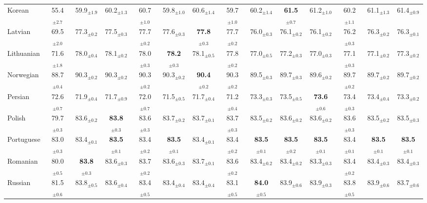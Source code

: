 \begin{table*}[ht]
{\begin{tabular}{lccccccccccccc}
Korean & 55.4$_{\pm 2.7}$ & 59.9$_{\pm 1.9}$ & 60.2$_{\pm 1.3}$ & 60.7$_{\pm 1.0}$ & 59.8$_{\pm 1.0}$ & 60.6$_{\pm 1.4}$ & 59.7$_{\pm 1.0}$ & 60.2$_{\pm 1.4}$ & \textbf{61.5}$_{\pm 0.7}$ & 61.2$_{\pm 1.0}$ & 60.2$_{\pm 1.1}$ & 61.1$_{\pm 1.3}$ & 61.4$_{\pm 0.9}$ \\
Latvian & 69.5$_{\pm 2.0}$ & 77.3$_{\pm 0.2}$ & 77.5$_{\pm 0.3}$ & 77.7$_{\pm 0.2}$ & 77.6$_{\pm 0.3}$ & \textbf{77.8}$_{\pm 0.3}$ & 77.7$_{\pm 0.2}$ & 76.0$_{\pm 0.3}$ & 76.1$_{\pm 0.2}$ & 76.1$_{\pm 0.2}$ & 76.2$_{\pm 0.3}$ & 76.3$_{\pm 0.2}$ & 76.3$_{\pm 0.1}$ \\
Lithuanian & 71.6$_{\pm 1.8}$ & 78.0$_{\pm 0.4}$ & 78.1$_{\pm 0.2}$ & 78.0$_{\pm 0.3}$ & \textbf{78.2}$_{\pm 0.3}$ & 78.1$_{\pm 0.5}$ & 77.8$_{\pm 0.2}$ & 77.0$_{\pm 0.5}$ & 77.2$_{\pm 0.3}$ & 77.0$_{\pm 0.3}$ & 77.1$_{\pm 0.3}$ & 77.1$_{\pm 0.2}$ & 77.3$_{\pm 0.2}$ \\
Norwegian & 88.7$_{\pm 0.4}$ & 90.3$_{\pm 0.2}$ & 90.3$_{\pm 0.2}$ & 90.3$_{\pm 0.2}$ & 90.3$_{\pm 0.2}$ & \textbf{90.4}$_{\pm 0.2}$ & 90.3$_{\pm 0.2}$ & 89.5$_{\pm 0.3}$ & 89.7$_{\pm 0.3}$ & 89.6$_{\pm 0.2}$ & 89.7$_{\pm 0.2}$ & 89.7$_{\pm 0.2}$ & 89.7$_{\pm 0.2}$ \\
Persian & 72.6$_{\pm 0.7}$ & 71.9$_{\pm 0.4}$ & 71.7$_{\pm 0.9}$ & 72.0$_{\pm 0.7}$ & 71.5$_{\pm 0.5}$ & 71.7$_{\pm 0.4}$ & 71.2$_{\pm 0.4}$ & 73.3$_{\pm 0.3}$ & 73.5$_{\pm 0.5}$ & \textbf{73.6}$_{\pm 0.6}$ & 73.4$_{\pm 0.3}$ & 73.4$_{\pm 0.4}$ & 73.3$_{\pm 0.2}$ \\
Polish & 79.7$_{\pm 0.3}$ & 83.6$_{\pm 0.2}$ & \textbf{83.8}$_{\pm 0.3}$ & 83.6$_{\pm 0.3}$ & 83.7$_{\pm 0.2}$ & 83.7$_{\pm 0.1}$ & 83.7$_{\pm 0.3}$ & 83.5$_{\pm 0.2}$ & 83.6$_{\pm 0.2}$ & 83.6$_{\pm 0.2}$ & 83.6$_{\pm 0.3}$ & 83.5$_{\pm 0.2}$ & 83.5$_{\pm 0.3}$ \\
Portuguese & 83.0$_{\pm 0.3}$ & 83.4$_{\pm 0.1}$ & \textbf{83.5}$_{\pm 0.1}$ & 83.4$_{\pm 0.2}$ & \textbf{83.5}$_{\pm 0.1}$ & 83.4$_{\pm 0.1}$ & 83.4$_{\pm 0.2}$ & \textbf{83.5}$_{\pm 0.1}$ & \textbf{83.5}$_{\pm 0.2}$ & \textbf{83.5}$_{\pm 0.1}$ & 83.4$_{\pm 0.1}$ & \textbf{83.5}$_{\pm 0.1}$ & \textbf{83.5}$_{\pm 0.1}$ \\
Romanian & 80.0$_{\pm 0.5}$ & \textbf{83.8}$_{\pm 0.3}$ & 83.6$_{\pm 0.3}$ & 83.7$_{\pm 0.2}$ & 83.6$_{\pm 0.3}$ & 83.7$_{\pm 0.1}$ & 83.6$_{\pm 0.2}$ & 83.4$_{\pm 0.2}$ & 83.4$_{\pm 0.2}$ & 83.3$_{\pm 0.3}$ & 83.4$_{\pm 0.2}$ & 83.4$_{\pm 0.3}$ & 83.4$_{\pm 0.3}$ \\
Russian & 81.5$_{\pm 0.6}$ & 83.8$_{\pm 0.5}$ & 83.6$_{\pm 0.4}$ & 83.4$_{\pm 0.5}$ & 83.4$_{\pm 0.4}$ & 83.4$_{\pm 0.4}$ & 83.1$_{\pm 0.5}$ & \textbf{84.0}$_{\pm 0.5}$ & 83.9$_{\pm 0.6}$ & 83.9$_{\pm 0.3}$ & 83.8$_{\pm 0.5}$ & 83.9$_{\pm 0.6}$ & 83.7$_{\pm 0.6}$ \\

\end{tabular}}
\end{table*}
